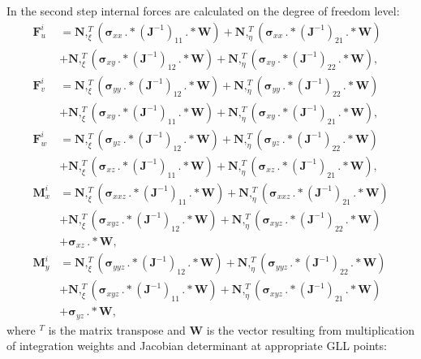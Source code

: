 \documentclass[preprint,12pt]{elsarticle}
\renewcommand{\vec}[1]{\mathbf{#1}}
\renewcommand{\bm}[1]{\mathbf{#1}}
\newcommand{\bs}[1]{\boldsymbol{#1}}
\begin{document}
	In the second step internal forces are calculated on the degree of freedom level: 
	\begin{equation}
	\begin{split}
	\vec{F}_u^i&=\bm{N},_{\xi}^T \left(\bs{\sigma}_{xx}\,.*(\vec{J}^{-1})_{11}\,.*\vec{W}\right)+\bm{N},_{\eta}^T \left(\bs{\sigma}_{xx}\,.*(\vec{J}^{-1})_{21}\,.*\vec{W}\right)\\
	&+\bm{N},_{\xi}^T \left(\bs{\sigma}_{xy}\,.*(\vec{J}^{-1})_{12}\,.*\vec{W}\right)+\bm{N},_{\eta}^T \left(\bs{\sigma}_{xy}\,.*(\vec{J}^{-1})_{22}\,.*\vec{W}\right), \\ 
	\vec{F}_v^i&=\bm{N},_{\xi}^T \left(\bs{\sigma}_{yy}\,.*(\vec{J}^{-1})_{12}\,.*\vec{W}\right)+\bm{N},_{\eta}^T \left(\bs{\sigma}_{yy}\,.*(\vec{J}^{-1})_{22}\,.*\vec{W}\right)\\
	&+\bm{N},_{\xi}^T \left(\bs{\sigma}_{xy}\,.*(\vec{J}^{-1})_{11}\,.*\vec{W}\right)+\bm{N},_{\eta}^T \left(\bs{\sigma}_{xy}\,.*(\vec{J}^{-1})_{21}\,.*\vec{W}\right),\\
	\vec{F}_w^i&=\bm{N},_{\xi}^T \left(\bs{\sigma}_{yz}\,.*(\vec{J}^{-1})_{12}\,.*\vec{W}\right)+\bm{N},_{\eta}^T \left(\bs{\sigma}_{yz}\,.*(\vec{J}^{-1})_{22}\,.*\vec{W}\right)\\
	& +\bm{N},_{\xi}^T \left(\bs{\sigma}_{xz}\,.*(\vec{J}^{-1})_{11}\,.*\vec{W}\right)+\bm{N},_{\eta}^T \left(\bs{\sigma}_{xz}\,.*(\vec{J}^{-1})_{21}\,.*\vec{W}\right),\\
	\vec{M}_x^i&=\bm{N},_{\xi}^T \left(\bs{\sigma}_{xxz}\,.*(\vec{J}^{-1})_{11}\,.*\vec{W}\right)+\bm{N},_{\eta}^T \left(\bs{\sigma}_{xxz}\,.*(\vec{J}^{-1})_{21}\,.*\vec{W}\right)\\
	&+\bm{N},_{\xi}^T \left(\bs{\sigma}_{xyz}\,.*(\vec{J}^{-1})_{12}\,.*\vec{W}\right)+\bm{N},_{\eta}^T \left(\bs{\sigma}_{xyz}\,.*(\vec{J}^{-1})_{22}\,.*\vec{W}\right)\\
	&+\bs{\sigma}_{xz}\,.*\vec{W},\\
	\vec{M}_y^i&=\bm{N},_{\xi}^T \left(\bs{\sigma}_{yyz}\,.*(\vec{J}^{-1})_{12}\,.*\vec{W}\right)+\bm{N},_{\eta}^T \left(\bs{\sigma}_{yyz}\,.*(\vec{J}^{-1})_{22}\,.*\vec{W}\right)\\
	&+\bm{N},_{\xi}^T \left(\bs{\sigma}_{xyz}\,.*(\vec{J}^{-1})_{11}\,.*\vec{W}\right)+\bm{N},_{\eta}^T \left(\bs{\sigma}_{xyz}\,.*(\vec{J}^{-1})_{21}\,.*\vec{W}\right)\\
	&+\bs{\sigma}_{yz}\,.*\vec{W},
	\label{eq:internal_forces}
	\end{split}
	\end{equation}
	where $^T$ is the matrix transpose and $\vec{W}$ is the vector resulting from multiplication of integration weights and Jacobian determinant at appropriate GLL points:
\end{document}
